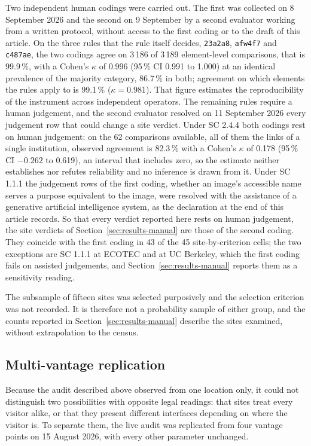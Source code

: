 \documentclass[]{interact}
\begin{document}
Two independent human codings were carried out. The first was collected on 8 September 2026 and the second on 9 September by a second evaluator working from a written protocol, without access to the first coding or to the draft of this article. On the three rules that the rule itself decides, \texttt{23a2a8}, \texttt{afw4f7} and \texttt{c487ae}, the two codings agree on 3\,186 of 3\,189 element-level comparisons, that is 99.9\,\%, with a Cohen's $\kappa$ of 0.996 (95\,\% CI 0.991 to 1.000) at an identical prevalence of the majority category, 86.7\,\% in both; agreement on which elements the rules apply to is 99.1\,\% ($\kappa=0.981$). That figure estimates the reproducibility of the instrument across independent operators. The remaining rules require a human judgement, and the second evaluator resolved on 11 September 2026 every judgement row that could change a site verdict. Under SC 2.4.4 both codings rest on human judgement: on the 62 comparisons available, all of them the links of a single institution, observed agreement is 82.3\,\% with a Cohen's $\kappa$ of 0.178 (95\,\% CI $-0.262$ to 0.619), an interval that includes zero, so the estimate neither establishes nor refutes reliability and no inference is drawn from it. Under SC 1.1.1 the judgement rows of the first coding, whether an image's accessible name serves a purpose equivalent to the image, were resolved with the assistance of a generative artificial intelligence system, as the declaration at the end of this article records. So that every verdict reported here rests on human judgement, the site verdicts of Section~\ref{sec:results-manual} are those of the second coding. They coincide with the first coding in 43 of the 45 site-by-criterion cells; the two exceptions are SC 1.1.1 at ECOTEC and at UC Berkeley, which the first coding fails on assisted judgements, and Section~\ref{sec:results-manual} reports them as a sensitivity reading.

The subsample of fifteen sites was selected purposively and the selection criterion was not recorded. It is therefore not a probability sample of either group, and the counts reported in Section~\ref{sec:results-manual} describe the sites examined, without extrapolation to the census.

\subsection{Multi-vantage replication}\label{sec:methods-vantage}

Because the audit described above observed from one location only, it could not distinguish two possibilities with opposite legal readings: that sites treat every visitor alike, or that they present different interfaces depending on where the visitor is. To separate them, the live audit was replicated from four vantage points on 15 August 2026, with every other parameter unchanged.
\end{document}

